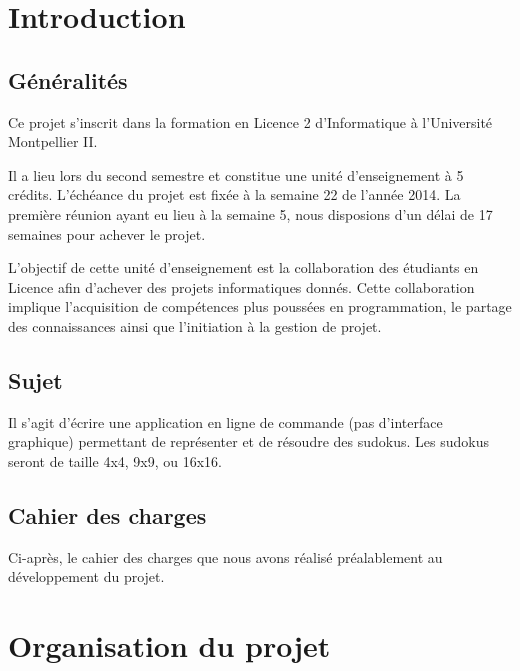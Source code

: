 \documentclass[a4paper, 12pt]{article}
\begin{document}
\clearpage

\listoffigures

\clearpage

\section{Introduction}

\subsection{Généralités}

	\par Ce projet s'inscrit dans la formation en Licence 2 d'Informatique à l'Université Montpellier II. 
	\par Il a lieu lors du second semestre et constitue une unité d'enseignement à 5 crédits. L'échéance du projet est fixée à la semaine 22 de l'année 2014. La première réunion ayant eu lieu à la semaine 5, nous disposions d'un délai de 17 semaines pour achever le projet.
	\par L'objectif de cette unité d'enseignement est la collaboration des étudiants en Licence afin d'achever des projets informatiques donnés. Cette collaboration implique l'acquisition de compétences plus poussées en programmation, le partage des connaissances ainsi que l'initiation à la gestion de projet.

\subsection{Sujet}

	\par Il s'agit d'écrire une application en ligne de commande (pas d'interface graphique) permettant de représenter et de résoudre des sudokus. Les sudokus seront de taille 4x4, 9x9, ou 16x16. 

\subsection{Cahier des charges}

	\par Ci-après, le cahier des charges que nous avons réalisé préalablement au développement du projet.

	

	\newpage
	\strut
	\newpage

\section{Organisation du projet}
\end{document}
